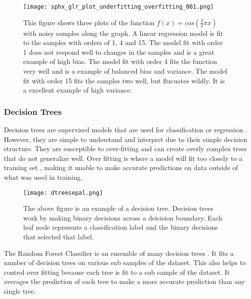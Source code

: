 \begin{figure}[htp]
    \centering
    \texttt{[image: sphx\_glr\_plot\_underfitting\_overfitting\_001.png]}
    \caption{This figure shows three plots of the function \( f(x) = cos(\frac{3}{2} \pi x)\) with noisy samples along the graph. 
    A linear regression model is fit to the samples with orders of 1, 4 and 15.
    The model fit with order 1 does not respond well to changes in the samples and is a great example of high bias.
    The model fit with order 4 fits the function very well and is a example of balanced bias and variance.
    The model fit with order 15 fits the samples two well, but flucuates wildly. 
    It is a excellent example of high variance.}
    \label{}
\end{figure}

\subsubsection{Decision Trees}
Decision trees are supervised models that are used for classification or regression \cite{breiman2017classification}.
However, they are simple to understand and interpret due to their simple decision structure. 
They are susceptible to over-fitting and can create overly complex trees that do not generalize well.
Over fitting is where a model will fit too closely to a training set \cite{cawley2010over}, making it unable to make accurate predictions on data outside of what was used in training.

\begin{figure}[htp]
    \centering
    \texttt{[image: dtreesepal.png]}
    \caption{The above figure is an example of a decision tree. Decision trees work by making binary decisions across a deicision boundary.
    Each leaf node represents a classification label and the binary decisions that selected that label.}
    \label{}
\end{figure}

\par
The Random Forest Classifier is an ensemble of many decision trees \cite{breiman2001random}.
It fits a number of decision trees on various sub samples of the dataset.
This also helps to control over fitting because each tree is fit to a sub sample of the dataset.
It averages the prediction of each tree to make a more accurate prediction than any single tree.


